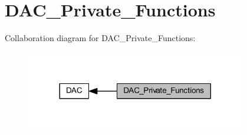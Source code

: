 \hypertarget{group___d_a_c___private___functions}{}\section{D\+A\+C\+\_\+\+Private\+\_\+\+Functions}
\label{group___d_a_c___private___functions}
Collaboration diagram for D\+A\+C\+\_\+\+Private\+\_\+\+Functions\+:
\nopagebreak
\begin{figure}[H]
\begin{center}
\leavevmode
\includegraphics[width=272pt]{group___d_a_c___private___functions}
\end{center}
\end{figure}

